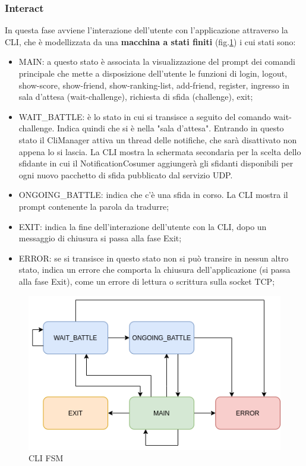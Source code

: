 \documentclass{article}
\begin{document}
    \subsubsection{Interact}\label{interact} In questa fase avviene l'interazione dell'utente con l'applicazione attraverso la CLI, che è modellizzata da una \textbf{macchina a stati finiti} (fig.\ref{fig:client_FSM}) i cui stati sono:
    \begin{itemize}
        \item MAIN: a questo stato è associata la visualizzazione del prompt dei comandi principale che mette a disposizione dell'utente le funzioni di login, logout, show-score, show-friend, show-ranking-list, add-friend, register, ingresso in sala d'attesa (wait-challenge), richiesta di sfida (challenge), exit;
        \item WAIT\_BATTLE: è lo stato in cui si transisce a seguito del comando wait-challenge. Indica quindi che si è nella "sala d'attesa". Entrando in questo stato il CliManager attiva un thread delle notifiche, che sarà disattivato non appena lo si lascia. La CLI mostra la schermata secondaria per la scelta dello sfidante in cui il NotificationCosumer aggiungerà gli sfidanti disponibili per ogni nuovo pacchetto di sfida pubblicato dal servizio UDP.
        \item ONGOING\_BATTLE: indica che c'è una sfida in corso. La CLI mostra il prompt contenente la parola da tradurre;
        \item EXIT: indica la fine dell'interazione dell'utente con la CLI, dopo un messaggio di chiusura si passa alla fase Exit;
        \item ERROR: se si transisce in questo stato non si può transire in nessun altro stato, indica un errore che comporta la chiusura dell'applicazione (si passa alla fase Exit), come un errore di lettura o scrittura sulla socket TCP;
    \end{itemize}

    \begin{figure}[htp]
        \centering
        \includegraphics[width=\textwidth]{stati.png}
        \caption{CLI FSM}
        \label{fig:client_FSM}
    \end{figure}
\end{document}
